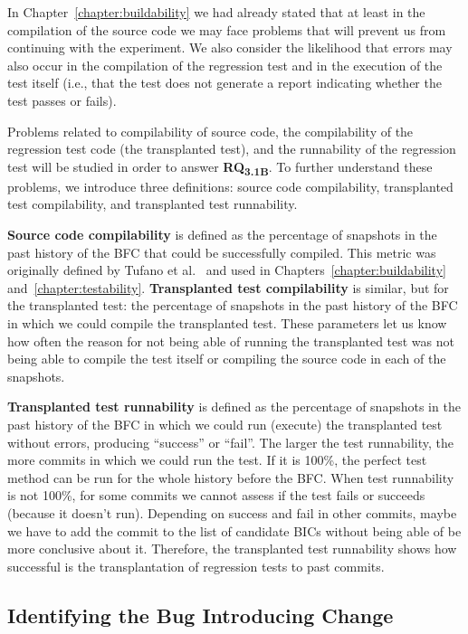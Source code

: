 In Chapter~\ref{chapter:buildability} we had already stated that at least in the compilation of the source code we may face problems that will prevent us from continuing with the experiment. 
We also consider the likelihood that errors may also occur in the compilation of the regression test and in the execution of the test itself (i.e., that the test does not generate a report indicating whether the test passes or fails).

Problems related to compilability of source code, the compilability of the regression test code (the transplanted test), and the runnability of the regression test will be studied in order to answer \textbf{RQ\textsubscript{3.1B}}. 
To further understand these problems, we introduce three definitions: source code compilability, transplanted test compilability, and transplanted test runnability.

\textbf{Source code compilability} is defined as the percentage of snapshots in the past history of the BFC that could be successfully compiled.
This metric was originally defined by Tufano et al.~\cite{tufano2017there} and used in Chapters~\ref{chapter:buildability} and~\ref{chapter:testability}. 
\textbf{Transplanted test compilability} is similar, but for the transplanted test: the percentage of snapshots in the past history of the BFC in which we could compile the transplanted test. 
These parameters let us know how often the reason for not being able of running the transplanted test was not being able to compile the test itself or compiling the source code in each of the snapshots.

\textbf{Transplanted test runnability} is defined as the percentage of snapshots in the past history of the BFC in which we could run (execute) the transplanted test without errors, producing ``success'' or ``fail''. The larger the test runnability, the more commits in which we could run the test. If it is 100\%, the perfect test method can be run for the whole history before the BFC. When test runnability is not 100\%, for some commits we cannot assess if the test fails or succeeds (because it doesn't run). Depending on success and fail in other commits, maybe we have to add the commit to the list of candidate BICs without being able of be more conclusive about it. Therefore, the transplanted test runnability shows how successful is the transplantation of regression tests to past commits.

\subsection{Identifying the Bug Introducing Change}
\label{subsec:identify-bic}

